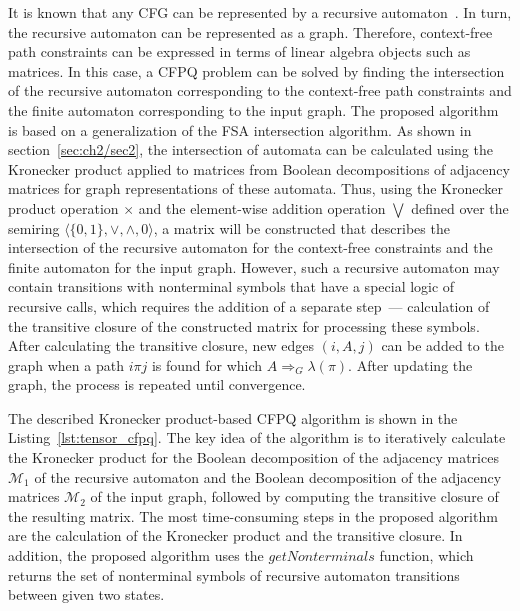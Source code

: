 It is known that any CFG can be represented by a recursive automaton~\cite{alur2005analysis}. In turn, the recursive automaton can be represented as a graph. Therefore, context-free path constraints can be expressed in terms of linear algebra objects such as matrices. In this case, a CFPQ problem can be solved by finding the intersection of the recursive automaton corresponding to the context-free path constraints and the finite automaton corresponding to the input graph. The proposed algorithm is based on a generalization of the FSA intersection algorithm. As shown in section~\ref{sec:ch2/sec2}, the intersection of automata can be calculated using the Kronecker product applied to matrices from Boolean decompositions of adjacency matrices for graph representations of these automata. Thus, using the Kronecker product operation $\times$ and the element-wise addition operation $\bigvee$ defined over the semiring $\langle \{0, 1\}, \vee, \wedge, 0 \rangle$, a matrix will be constructed that describes the intersection of the recursive automaton for the context-free constraints and the finite automaton for the input graph. However, such a recursive automaton may contain transitions with nonterminal symbols that have a special logic of recursive calls, which requires the addition of a separate step~--- calculation of the transitive closure of the constructed matrix for processing these symbols. After calculating the transitive closure, new edges $(i, A, j)$ can be added to the graph when a path $i\pi j$ is found for which $A \Rightarrow_G \lambda(\pi)$. After updating the graph, the process is repeated until convergence.

The described Kronecker product-based CFPQ algorithm is shown in the Listing~\ref{lst:tensor_cfpq}. The key idea of the algorithm is to iteratively calculate the Kronecker product for the Boolean decomposition of the adjacency matrices $\mathcal{M}_1$ of the recursive automaton and the Boolean decomposition of the adjacency matrices $\mathcal{M}_2$ of the input graph, followed by computing the transitive closure of the resulting matrix. The most time-consuming steps in the proposed algorithm are the calculation of the Kronecker product and the transitive closure. In addition, the proposed algorithm uses the $\textit{getNonterminals}$ function, which returns the set of nonterminal symbols of recursive automaton transitions between given two states.

